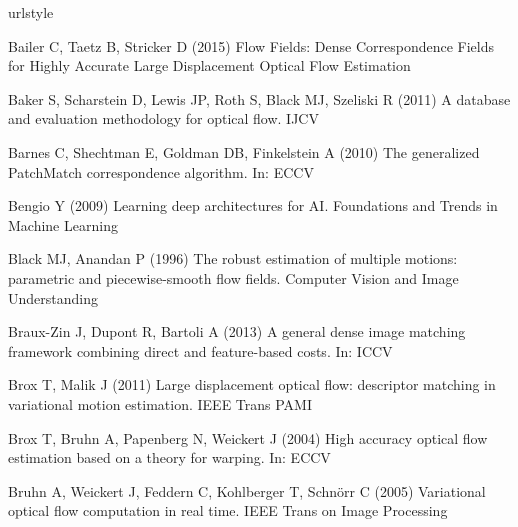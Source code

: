 \documentclass[twocolumn,natbib]{svjour3}
\begin{document}

\begin{thebibliography}{57}
\providecommand{\natexlab}[1]{#1}
\providecommand{\url}[1]{{#1}}
\providecommand{\urlprefix}{URL }
\expandafter\ifx\csname urlstyle\endcsname\relax
  \providecommand{\doi}[1]{DOI~\discretionary{}{}{}#1}\else
  \providecommand{\doi}{DOI~\discretionary{}{}{}\begingroup
  \urlstyle{rm}\Url}\fi
\providecommand{\eprint}[2][]{\url{#2}}

Bailer C, Taetz B, Stricker D (2015) {Flow Fields: Dense Correspondence Fields
  for Highly Accurate Large Displacement Optical Flow Estimation}

Baker S, Scharstein D, Lewis JP, Roth S, Black MJ, Szeliski R (2011) A database
  and evaluation methodology for optical flow. IJCV

Barnes C, Shechtman E, Goldman DB, Finkelstein A (2010) The generalized
  {PatchMatch} correspondence algorithm. In: ECCV

Bengio Y (2009) Learning deep architectures for {AI}. Foundations and Trends in
  Machine Learning

Black MJ, Anandan P (1996) The robust estimation of multiple motions:
  parametric and piecewise-smooth flow fields. Computer Vision and Image
  Understanding

Braux-Zin J, Dupont R, Bartoli A (2013) A general dense image matching
  framework combining direct and feature-based costs. In: ICCV

Brox T, Malik J (2011) Large displacement optical flow: descriptor matching in
  variational motion estimation. IEEE Trans PAMI

Brox T, Bruhn A, Papenberg N, Weickert J (2004) High accuracy optical flow
  estimation based on a theory for warping. In: ECCV

Bruhn A, Weickert J, Feddern C, Kohlberger T, Schn{\"o}rr C (2005) Variational
  optical flow computation in real time. IEEE Trans on Image Processing


\end{thebibliography}
\end{document}
